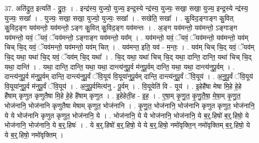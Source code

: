 \documentclass[17pt]{extarticle}
\begin{document}
37. अति॑द्रुत॒ इत्यति॑ - द्रु॒तः॒ । . इन्द्र॑स्य॒ युज्यो॒ युज्य॒ इन्द्र॒स्ये न्द्र॑स्य॒ युज्यः॒ सखा॒ सखा॒ युज्य॒ इन्द्र॒स्ये न्द्र॑स्य॒ युज्यः॒ सखा᳚ । . युज्यः॒ सखा॒ सखा॒ युज्यो॒ युज्यः॒ सखा᳚ । . सखेति॒ सखा᳚ । . कु॒विद॒ङ्गाङ्ग कु॒वित् कु॒विद॒ङ्ग यव॑मन्तो॒ यव॑मन्तो॒ ऽङ्ग कु॒वित् कु॒विद॒ङ्ग यव॑मन्तः । . अ॒ङ्ग यव॑मन्तो॒ यव॑मन्तो॒ ऽङ्गाङ्ग यव॑मन्तो॒ यवं॒ ॅयवं॒ ॅयव॑मन्तो॒ ऽङ्गाङ्ग यव॑मन्तो॒ यव᳚म् । . यव॑मन्तो॒ यवं॒ ॅयवं॒ ॅयव॑मन्तो॒ यव॑मन्तो॒ यव॑म् चिच् चि॒द् यवं॒ ॅयव॑मन्तो॒ यव॑मन्तो॒ यव॑म् चित् । . यव॑मन्त॒ इति॒ यव॑ - म॒न्तः॒ । . यव॑म् चिच् चि॒द् यवं॒ ॅयव॑म् चि॒द् यथा॒ यथा॑ चि॒द् यवं॒ ॅयव॑म् चि॒द् यथा᳚ । . चि॒द् यथा॒ यथा॑ चिच् चि॒द् यथा॒ दान्ति॒ दान्ति॒ यथा॑ चिच् चि॒द् यथा॒ दान्ति॑ । . यथा॒ दान्ति॒ दान्ति॒ यथा॒ यथा॒ दान्त्य॑नुपू॒र्व म॑नुपू॒र्वम् दान्ति॒ यथा॒ यथा॒ दान्त्य॑नुपू॒र्वम् । . दान्त्य॑नुपू॒र्व म॑नुपू॒र्वम् दान्ति॒ दान्त्य॑नुपू॒र्वं ॅवि॒यूय॑ वि॒यूया॑नुपू॒र्वम् दान्ति॒ दान्त्य॑नुपू॒र्वं ॅवि॒यूय॑ । . अ॒नु॒पू॒र्वं ॅवि॒यूय॑ वि॒यूया॑नुपू॒र्व म॑नुपू॒र्वं ॅवि॒यूय॑ । . अ॒नु॒पू॒र्वमित्य॑नु - पू॒र्वम् । . वि॒यूयेति॑ वि - यूय॑ । . इ॒हेहै॑षा मेषा मि॒हे हे॒हे है॑षाम् कृणुत कृणुतैषा मि॒हे हे॒हे है॑षाम् कृणुत । . इ॒हेहेती॒ह - इ॒ह॒ । . ए॒षा॒म् कृ॒णु॒त॒ कृ॒णु॒तै॒षा॒ मे॒षा॒म् कृ॒णु॒त॒ भोज॑नानि॒ भोज॑नानि कृणुतैषा मेषाम् कृणुत॒ भोज॑नानि । . कृ॒णु॒त॒ भोज॑नानि॒ भोज॑नानि कृणुत कृणुत॒ भोज॑नानि॒ ये ये भोज॑नानि कृणुत कृणुत॒ भोज॑नानि॒ ये । . भोज॑नानि॒ ये ये भोज॑नानि॒ भोज॑नानि॒ ये ब॒र्॒.हिषो॑ ब॒र्॒.हिषो॒ ये भोज॑नानि॒ भोज॑नानि॒ ये ब॒र्॒.हिषः॑ । . ये ब॒र्॒.हिषो॑ ब॒र्॒.हिषो॒ ये ये ब॒र्॒.हिषो॒ नमो॑वृक्ति॒न् नमो॑वृक्तिम् ब॒र्॒.हिषो॒ ये ये ब॒र्॒.हिषो॒ नमो॑वृक्तिम् । \newline
\end{document}
